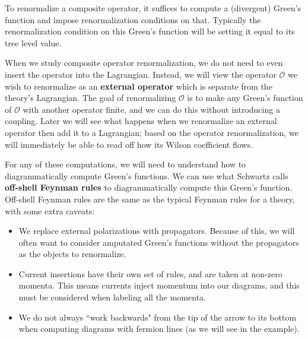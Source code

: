 \documentclass[11pt, oneside]{article}   	%
\theoremstyle{definition}
\begin{document}
To renormalize a composite operator, it suffices to compute a (divergent) Green's function and impose renormalization 
conditions on that. Typically the renormalization condition on this Green's function will be setting it equal to its 
tree level value. 

When we study composite operator renormalization, we do not need to even insert the operator into the Lagrangian. Instead, 
we will view the operator $\mathcal O$ we wish to renormalize as an \textbf{external operator} which is separate from the 
theory's Lagrangian. The goal of renormalizing $\mathcal O$ is to make any Green's function of $\mathcal O$ with another 
operator finite, and we can do this without introducing a coupling. Later we will see what happens when we renormalize 
an external operator then add it to a Lagrangian; based on the operator renormalization, we will immediately be able 
to read off how its Wilson coefficient flows. 

For any of these computations, we will need to understand how to diagrammatically compute Green's functions. We can use 
what Schwartz calls \textbf{off-shell Feynman rules} to diagrammatically compute this Green's function. Off-shell Feynman 
rules are the same as the typical Feynman rules for a theory, with some extra caveats:
\begin{itemize}
	\item We replace external polarizations with propagators. Because of this, we will often want to consider amputated 
	Green's functions without the propagators as the objects to renormalize. 
	\item Current insertions have their own set of rules, and are taken at non-zero momenta. This means currents 
	inject momentum into our diagrams, and this must be considered when labeling all the momenta. 
	\item We do not always ``work backwards" from the tip of the arrow to its bottom when computing diagrams with 
	fermion lines (as we will see in the example). 
\end{itemize}
\end{document}
